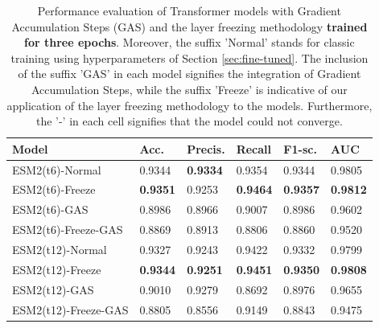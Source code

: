 \begin{table}[h]
	\centering
	\caption{Performance evaluation of Transformer models with Gradient Accumulation Steps (GAS) and the layer freezing methodology \textbf{trained for three epochs}. Moreover, the suffix 'Normal' stands for classic training using hyperparameters of Section \ref{sec:fine-tuned}. The inclusion of the suffix 'GAS' in each model signifies the integration of Gradient Accumulation Steps, while the suffix 'Freeze' is indicative of our application of the layer freezing methodology to the models. Furthermore, the '-' in each cell signifies that the model could not converge.}
	\label{tab:comparison_3_epochs}
	
	\tiny
	\begin{tabular}{llllll} \hline
		\textbf{Model}       & \textbf{Acc.} & \textbf{Precis.} & \textbf{Recall} & \textbf{F1-sc.} & \textbf{AUC}   %
		\\ \hline
		ESM2(t6)-Normal             & 0.9344            & \textbf{0.9334}    & 0.9354          & 0.9344            & 0.9805          %
		\\
		ESM2(t6)-Freeze      & \textbf{0.9351}   & 0.9253             & \textbf{0.9464} & \textbf{0.9357}   & \textbf{0.9812} %
		\\
		ESM2(t6)-GAS         & 0.8986            & 0.8966             & 0.9007          & 0.8986            & 0.9602          %
		\\
		ESM2(t6)-Freeze-GAS  & 0.8869            & 0.8913             & 0.8806          & 0.8860            & 0.9520          %
		\\ \hline
		
		
		ESM2(t12)-Normal            & 0.9327            & 0.9243             & 0.9422          & 0.9332            & 0.9799          %
		\\
		ESM2(t12)-Freeze     & \textbf{0.9344}   & \textbf{0.9251}    & \textbf{0.9451} & \textbf{0.9350}   & \textbf{0.9808} %
		\\
		ESM2(t12)-GAS        & 0.9010            & 0.9279             & 0.8692          & 0.8976            & 0.9655          %
		\\
		ESM2(t12)-Freeze-GAS & 0.8805            & 0.8556             & 0.9149          & 0.8843            & 0.9475          %
		\\ \hline
		

\end{tabular}
\end{table}
